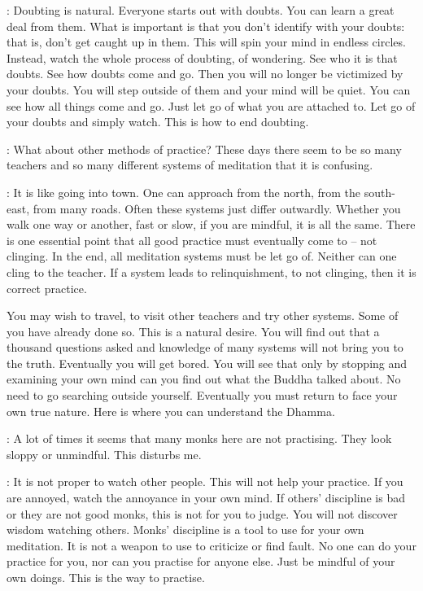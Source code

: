 : Doubting is natural. Everyone starts out with doubts. You can learn a great deal from them. What is important is that you don't identify with your doubts: that is, don't get caught up in them. This will spin your mind in endless circles. Instead, watch the whole process of doubting, of wondering. See who it is that doubts. See how doubts come and go. Then you will no longer be victimized by your doubts. You will step outside of them and your mind will be quiet. You can see how all things come and go. Just let go of what you are attached to. Let go of your doubts and simply watch. This is how to end doubting. 

:
What about other methods of practice? These days there seem to be so many teachers and so many different systems of meditation that it is confusing. 

:
It is like going into town. One can approach from the north, from the south-east, from many roads. Often these systems just differ outwardly. Whether you walk one way or another, fast or slow, if you are mindful, it is all the same. There is one essential point that all good practice must eventually come to -- not clinging. In the end, all meditation systems must be let go of. Neither can one cling to the teacher. If a system leads to relinquishment, to not clinging, then it is correct practice. 

You may wish to travel, to visit other teachers and try other systems. Some of you have already done so. This is a natural desire. You will find out that a thousand questions asked and knowledge of many systems will not bring you to the truth. Eventually you will get bored. You will see that only by stopping and examining your own mind can you find out what the Buddha talked about. No need to go searching outside yourself. Eventually you must return to face your own true nature. Here is where you can understand the Dhamma. 

:
A lot of times it seems that many monks here are not practising. They look sloppy or unmindful. This disturbs me. 

: It is not proper to watch other people. This will not help your practice. If you are annoyed, watch the annoyance in your own mind. If others' discipline is bad or they are not good monks, this is not for you to judge. You will not discover wisdom watching others. Monks' discipline is a tool to use for your own meditation. It is not a weapon to use to criticize or find fault. No one can do your practice for you, nor can you practise for anyone else. Just be mindful of your own doings. This is the way to practise. 

